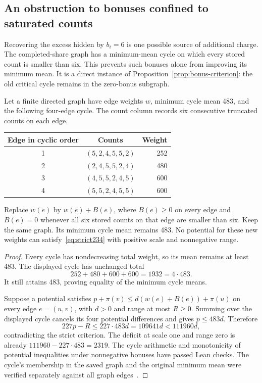 \subsection{An obstruction to bonuses confined to saturated counts}\label{sec:unsaturated-obstruction}
Recovering the excess hidden by $b_i=6$ is one possible source of additional
charge. The completed-share graph has a minimum-mean cycle on which every
stored count is smaller than six. This prevents such bonuses alone from
improving its minimum mean. It is a direct instance of
Proposition~\ref{prop:bonus-criterion}: the old critical cycle remains in
the zero-bonus subgraph.

\begin{proposition}\label{prop:unsaturated-cycle}
Let a finite directed graph have edge weights $w$, minimum cycle mean 483,
and the following four-edge cycle. The count column records six consecutive
truncated counts on each edge.
\begin{center}
\begin{tabular}{c c r}
\toprule
Edge in cyclic order & Counts & Weight\\\midrule
1 & $(5,2,4,5,5,2)$ & 252\\
2 & $(2,4,5,5,2,4)$ & 480\\
3 & $(4,5,5,2,4,5)$ & 600\\
4 & $(5,5,2,4,5,5)$ & 600\\
\bottomrule
\end{tabular}
\end{center}
Replace $w(e)$ by $w(e)+B(e)$, where $B(e)\ge0$ on every edge and $B(e)=0$
whenever all six stored counts on that edge are smaller than six. Keep the
same graph. Its minimum cycle mean remains 483. No potential for these new
weights can satisfy~\eqref{eq:strict234} with positive scale and nonnegative
range.
\end{proposition}
\begin{proof}
Every cycle has nondecreasing total weight, so its mean remains at least 483.
The displayed cycle has unchanged total
\[
252+480+600+600=1932=4\cdot483.
\]
It still attains 483, proving equality of the minimum cycle means.

Suppose a potential satisfies $p+\pi(v)\le d(w(e)+B(e))+\pi(u)$ on every
edge $e=(u,v)$, with $d>0$ and range at most $R\ge0$. Summing over the displayed
cycle cancels its four potential differences and gives $p\le483d$. Therefore
\[
227p-R\le227\cdot483d=109641d<111960d,
\]
contradicting the strict criterion. The deficit at scale one and range zero
is already $111960-227\cdot483=2319$. The cycle arithmetic and monotonicity
of potential inequalities under nonnegative bonuses have passed Lean checks.
The cycle's membership in the saved graph and the original minimum mean were
verified separately against all graph edges~\cite{unsaturatedarchive}.
\end{proof}

